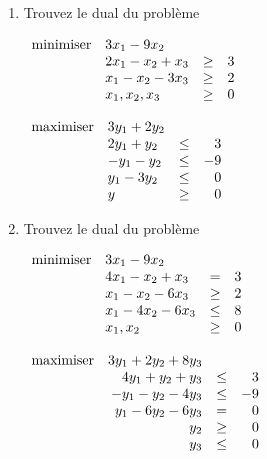 \begin{enumerate}

  \item \label{e5.1} Trouvez le dual du problème

    $
    \begin{array}{llcr}
      \mbox{minimiser} & 3x_1-9x_2\\
      & 2x_1-x_2+x_3 & \geq & 3\\
      & x_1-x_2 -3x_3 & \geq & 2\\
      & x_1, x_2, x_3 & \geq & 0
    \end{array}
    $

    \begin{solution}
      $
      \begin{array}{llcr}
        \mbox{maximiser} & 3y_1 + 2y_2\\
        & 2y_1 + y_2 & \leq & 3\\
        & -y_1 - y_2 & \leq & -9\\
        & y_1 - 3y_2 & \leq & 0\\
        & y & \geq & 0
      \end{array}
      $
    \end{solution}


  \item Trouvez le dual du problème

    $
    \begin{array}{llcr}
      \mbox{minimiser} & 3x_1-9x_2\\
      & 4x_1-x_2+x_3 & = & 3\\
      & x_1-x_2 -6x_3 & \geq & 2\\
      & x_1-4x_2 -6x_3 & \leq & 8\\
      & x_1, x_2 & \geq & 0
    \end{array}
    $

    \begin{solution}
      $
      \begin{array}{lrcr}
        \maxi & 3y_1 + 2y_2 + 8y_3\\
        & 4y_1 + y_2 + y_3 & \leq & 3\\
        & -y_1 -y_2 -4y_3 & \leq & -9\\
        & y_1 -6y_2 -6y_3 & = & 0\\
        & y_2 & \geq & 0\\
        & y_3 & \leq & 0

      \end{array}
      $
    \end{solution}



\end{enumerate}
